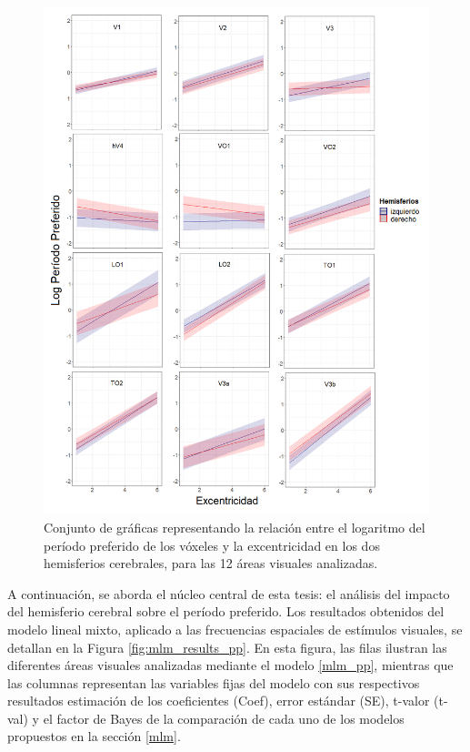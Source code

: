 \begin{figure}
	\centering
	\includegraphics[scale=0.6]{Graphics/compuesto_rois_pp_vs_eccen_hem}
	\caption{Conjunto de gráficas representando la relación entre el logaritmo del per\'iodo preferido de los v\'oxeles y la excentricidad en los dos hemisferios cerebrales, para las 12 áreas visuales analizadas.}
	\label{fig:hem}
\end{figure}

A continuación, se aborda el núcleo central de esta tesis: el análisis del impacto del hemisferio cerebral sobre el per\'iodo preferido. Los resultados obtenidos del modelo lineal mixto, aplicado a las frecuencias espaciales de estímulos visuales, se detallan en la Figura \ref{fig:mlm_results_pp}. En esta figura, las filas ilustran las diferentes áreas visuales analizadas mediante el modelo \ref{mlm_pp}, mientras que las columnas representan las variables fijas del modelo con sus respectivos resultados estimación de los coeficientes (Coef), error estándar (SE), t-valor (t-val) y el factor de Bayes de la comparaci\'on de cada uno de los modelos propuestos en la secci\'on \ref{mlm}.

